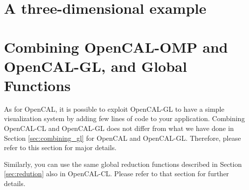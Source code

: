 \section{A three-dimensional example}

\section{Combining OpenCAL-OMP and OpenCAL-GL, and Global Functions}

As for OpenCAL, it is possible to exploit OpenCAL-GL to have a simple
visualization system by adding few lines of code to your
application. Combining OpenCAL-CL and OpenCAL-GL does not differ from
what we have done in Section \ref{sec:combining_gl} for OpenCAL and
OpenCAL-GL. Therefore, please refer to this section for major
details.

Similarly, you can use the same global reduction functions
described in Section \ref{sec:redution} also in OpenCAL-CL.  Please
refer to that section for further details.
